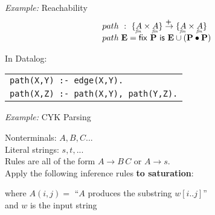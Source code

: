 \documentclass{beamer}
\newcommand{\mto}{\overset{\textbf{+}\:}{\to}}
\newcommand{\fin}[1]{\underaccent{\mathit{fin}}{#1}}
\newcommand{\m}[1]{\ensuremath{\mathbf{#1}}}
\newcommand{\ms}{\mathsf}
\begin{document}
\begin{frame}{{\it Example:} Reachability}\Large
  \[\begin{array}{l}
    path ~:~ \{\fin{A} \times \fin{A}\} \mto \{\fin{A} \times \fin{A}\}\\
    path\;\m{E} = \ms{fix}~\m{P}~\ms{is}~ \m{E} \cup (\m{P} \bullet \m{P})
  \end{array}\]

  \vspace{1.5em}

  In Datalog:\vspace{1em}\\
  \begin{tabular}{l}
    \texttt{path(X,Y) :- edge(X,Y).}\\
    \texttt{path(X,Z) :- path(X,Y), path(Y,Z).}\\
  \end{tabular}
\end{frame}


\begin{frame}{{\it Example:} CYK Parsing}
  \large

  Nonterminals: $A, B, C...$\\
  Literal strings: ${s}, {t}, ...$\vspace{1em}\\
  Rules are all of the form $A \to B\,C$ or $A \to {s}$.\pause
  \vspace{1em}\\

  Apply the following inference rules \textbf{to saturation}:\pause
  \vspace{0.5em}
  \Large{}

  \vspace{0.5em}\large

  where $A(i,j) =$ ``$A$ produces the substring $w[i..j]$''\\
  and $w$ is the input string
\end{frame}
\end{document}
